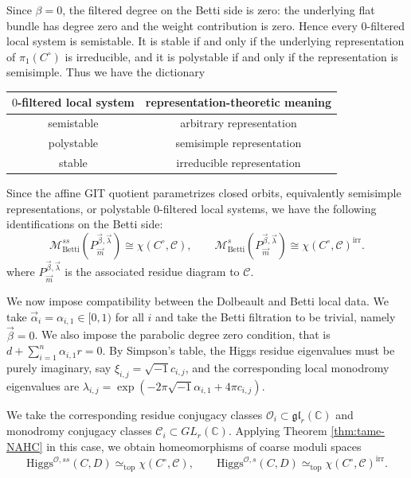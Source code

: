 \documentclass[11pt]{amsart}
\theoremstyle{plain}
\theoremstyle{definition}
\theoremstyle{remark}
\newcommand{\C}{\mathbb C}
\newcommand{\cO}{\mathcal O}
\newcommand{\Higgs}{\mathrm{Higgs}}
\def\C{\mathbb{C}}
\begin{document}
Since $\beta=0$, the filtered degree on the Betti side is zero: the underlying flat bundle has degree zero and the weight contribution is zero. Hence every $0$-filtered local system is semistable. It is stable if and only if the underlying representation of $\pi_1(C^\circ)$ is irreducible, and it is polystable if and only if the representation is semisimple. Thus we have the dictionary
\begin{center}
	\begin{tabular}{|c|c|}
		\hline
		$0$-filtered local system & representation-theoretic meaning \\
		\hline
		semistable & arbitrary representation \\
		\hline
		polystable & semisimple representation \\
		\hline
		stable & irreducible representation \\
		\hline
	\end{tabular}
\end{center}
Since the affine GIT quotient parametrizes closed orbits, equivalently semisimple representations, or polystable $0$-filtered local systems, we have the following identifications on the Betti side:
\[
\mathcal M^{ss}_{\mathrm{Betti}}(P^{\vec\beta,\vec\lambda}_{\vec m})
\cong
\chi(C^\circ,\mathcal C),
\qquad
\mathcal M^{s}_{\mathrm{Betti}}(P^{\vec\beta,\vec\lambda}_{\vec m})
\cong
\chi(C^\circ,\mathcal C)^{\mathrm{irr}}.
\]
where $P^{\vec\beta,\vec\lambda}_{\vec m}$ is the associated residue diagram to $\mathcal{C}$.

We now impose compatibility between the Dolbeault and Betti local data. We take $\vec\alpha_i=\alpha_{i,1}\in[0,1)$ for all $i$ and take the Betti filtration to be trivial, namely $\vec\beta=0$. We also impose the parabolic degree zero condition, that is $d+\sum_{i=1}^n\alpha_{i,1}r=0$. By Simpson's table, the Higgs residue eigenvalues must be purely imaginary, say $\xi_{i,j}=\sqrt{-1}c_{i,j}$, and the corresponding local monodromy eigenvalues are $
\lambda_{i,j}=\exp(-2\pi\sqrt{-1}\alpha_{i,1}+4\pi c_{i,j})$.


We take the corresponding residue conjugacy classes $\cO_i\subset\mathfrak{gl}_r(\C)$ and monodromy conjugacy classes $\mathcal C_i\subset GL_r(\C)$. Applying Theorem \ref{thm:tame-NAHC} in this case, we obtain homeomorphisms of coarse moduli spaces
\begin{equation}\label{e:higgsOchar}
    \Higgs^{\cO,ss}(C,D)\simeq_{\mathrm{top}}\chi(C^\circ,\mathcal C),
    \qquad
    \Higgs^{\cO,s}(C,D)\simeq_{\mathrm{top}}\chi(C^\circ,\mathcal C)^{\operatorname{irr}}.
\end{equation}
\end{document}
